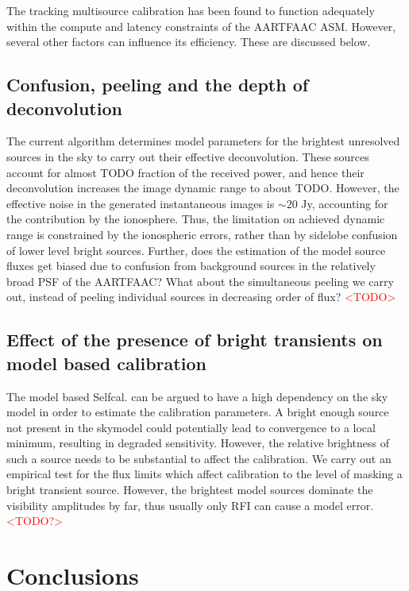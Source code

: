 \documentclass{aa}
\begin{document}
The tracking multisource calibration has been found to function adequately
within the compute and latency constraints of the AARTFAAC ASM. However,
several other factors can influence its efficiency. These are discussed
below.


\subsection{\label{sub:Confusion,-peeling-and}Confusion, peeling and the depth
of deconvolution }

The current algorithm determines model parameters for the brightest
unresolved sources in the sky to carry out their effective deconvolution.
These sources account for almost TODO fraction of the received power,
and hence their deconvolution increases the image dynamic range to
about TODO. However, the effective noise in the generated instantaneous
images is $\sim20$ Jy, accounting for the contribution by the ionosphere.
Thus, the limitation on achieved dynamic range is constrained by the
ionospheric errors, rather than by sidelobe confusion of lower level
bright sources. Further, does the estimation of the model source fluxes
get biased due to confusion from background sources in the relatively
broad PSF of the AARTFAAC? What about the simultaneous peeling we
carry out, instead of peeling individual sources in decreasing order
of flux?\textcolor{red}{{} <TODO> }


\subsection{Effect of the presence of bright transients on model based calibration}

The model based Selfcal. can be argued to have a high dependency on
the sky model in order to estimate the calibration parameters. A bright
enough source not present in the skymodel could potentially lead to
convergence to a local minimum, resulting in degraded sensitivity.
However, the relative brightness of such a source needs to be substantial
to affect the calibration. We carry out an empirical test for the
flux limits which affect calibration to the level of masking a bright
transient source. However, the brightest model sources dominate the
visibility amplitudes by far, thus usually only RFI can cause a model
error. \textcolor{red}{<TODO?>}


\section{Conclusions}
\end{document}
